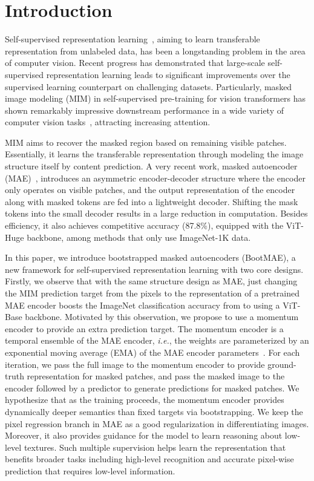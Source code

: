 \documentclass[runningheads]{llncs}
\begin{document}
\vspace{-1mm}
\section{Introduction}
\vspace{-1mm}
Self-supervised representation learning~\cite{xie2016unsupervised,van2018representation,yang2016joint,zhuang2019local,ermolov2021whitening,henaff2020data,chen2020simple}, aiming to learn transferable representation from unlabeled data, has been a longstanding problem in the area of computer vision. Recent progress has demonstrated that large-scale self-supervised representation learning leads to significant improvements over the supervised learning counterpart on challenging datasets.
Particularly,
masked image modeling (MIM) in self-supervised pre-training for vision transformers has shown remarkably impressive downstream performance in a wide variety of computer vision tasks~\cite{dosovitskiy2020image,bao2021beit}, attracting increasing attention.

MIM aims to recover the masked region based on remaining visible patches. Essentially, it learns the transferable representation through modeling the image structure itself by content prediction. A very recent work, masked autoencoder (MAE)~\cite{he2021masked}, 
introduces an asymmetric encoder-decoder structure where the encoder only operates on visible patches, and the output representation of the encoder along with masked tokens are fed into a lightweight decoder.
Shifting the mask tokens into the small decoder results in a large reduction in computation. Besides efficiency, it also
achieves competitive accuracy (87.8\%), equipped with the ViT-Huge backbone, among methods that only use ImageNet-1K data.

In this paper, we introduce bootstrapped masked autoencoders (BootMAE), a new framework for self-supervised representation learning with two core designs. Firstly, we observe that with the same structure design as MAE, just changing the MIM prediction target from the pixels to the representation of a pretrained MAE encoder boosts the ImageNet classification accuracy from  to  using a ViT-Base backbone.
Motivated by this observation, we propose to use a momentum encoder to provide an extra prediction target. The momentum encoder is a temporal ensemble of the MAE encoder, \emph{i.e.}, the weights are parameterized by an exponential moving average (EMA) of the MAE encoder parameters~\cite{he2020momentum,grill2020bootstrap}. For each iteration, we pass the full image to the momentum encoder to provide ground-truth representation for masked patches, and pass the masked image to the encoder followed by a predictor to generate predictions for masked patches.
We hypothesize that as the training proceeds, the momentum encoder provides dynamically deeper semantics than fixed targets via bootstrapping. We keep the pixel regression branch in MAE as a good regularization in differentiating images. Moreover, it also provides guidance for the model to learn reasoning about low-level textures. Such multiple supervision helps learn the representation that benefits broader tasks including high-level recognition and accurate pixel-wise prediction that requires low-level information.
\end{document}
